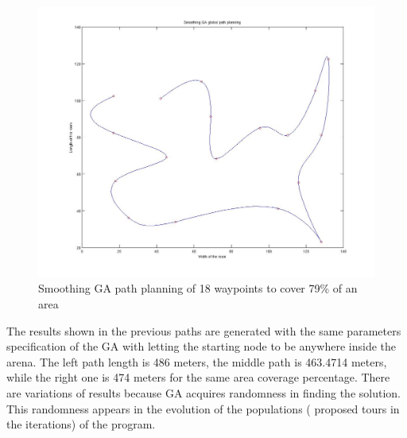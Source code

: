 \begin{figure}[h]
  \includegraphics[width=\linewidth]{figures/18pts_GA_linear_2D_3_smooth.jpg}  
  \endminipage
  \caption{Smoothing GA path planning of 18 waypoints to cover 79\% of an area}
  \label{fig:smooth_ga_18}
\end{figure}

\hfill

The results shown in the previous paths are generated with the same parameters specification of the GA with letting the starting node to be anywhere inside the arena. The left path length is 486 meters, the middle path is 463.4714 meters, while the right one is 474 meters for the same area coverage percentage. There are variations of results because GA acquires randomness in finding the solution. This randomness appears in the evolution of the populations ( proposed tours in the iterations) of the program.

